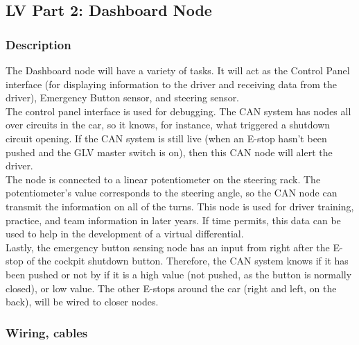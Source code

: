 \documentclass{article}
\begin{document}
    \subsection{LV Part 2: Dashboard Node}

        \subsubsection{Description}
        
            The Dashboard node will have a variety of tasks. It will act as the Control Panel interface (for displaying information to the driver and receiving data from the driver), Emergency Button sensor, and steering sensor.\\
            
            The control panel interface is used for debugging. The CAN system has nodes all over circuits in the car, so it knows, for instance, what triggered a shutdown circuit opening. If the CAN system is still live (when an E-stop hasn't been pushed and the GLV master switch is on), then this CAN node will alert the driver.\\
            
            The node is connected to a linear potentiometer on the steering rack. The potentiometer's value corresponds to the steering angle, so the CAN node can transmit the information on all of the turns. This node is used for driver training, practice, and team information in later years. If time permits, this data can be used to help in the development of a virtual differential.\\
            
            Lastly, the emergency button sensing node has an input from right after the E-stop of the cockpit shutdown button. Therefore, the CAN system knows if it has been pushed or not by if it is a high value (not pushed, as the button is normally closed), or low value. The other E-stops around the car (right and left, on the back), will be wired to closer nodes. 

        \subsubsection{Wiring, cables}
\end{document}
